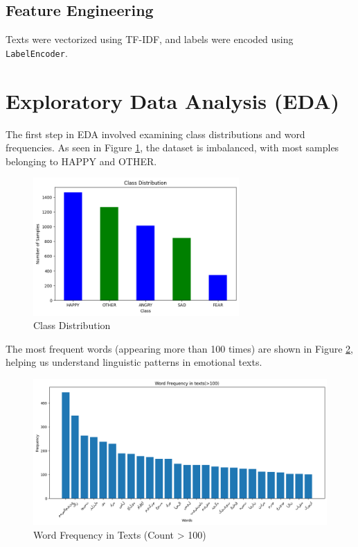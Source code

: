 \documentclass[12pt]{article}
\begin{document}
\subsection{Feature Engineering}
Texts were vectorized using TF-IDF, and labels were encoded using \texttt{LabelEncoder}.

\section{Exploratory Data Analysis (EDA)}
The first step in EDA involved examining class distributions and word frequencies. As seen in Figure \ref{fig:classdist}, the dataset is imbalanced, with most samples belonging to HAPPY and OTHER.

\begin{figure}[H]
    \centering
    \includegraphics[width=0.7\textwidth]{output2.png}
    \caption{Class Distribution}
    \label{fig:classdist}
\end{figure}

The most frequent words (appearing more than 100 times) are shown in Figure \ref{fig:wordfreq}, helping us understand linguistic patterns in emotional texts.

\begin{figure}[H]
    \centering
    \includegraphics[width=\textwidth]{output.png}
    \caption{Word Frequency in Texts (Count > 100)}
    \label{fig:wordfreq}
\end{figure}
\end{document}
